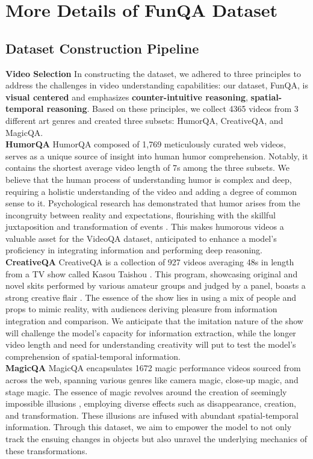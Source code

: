 \section{More Details of FunQA Dataset} \label{appendix_a: FunQA more details}
\subsection{Dataset Construction Pipeline} \label{appendix_a:dataset con}
\noindent\textbf{Video Selection}\quad
In constructing the dataset, we adhered to three principles to address the challenges in video understanding capabilities: our dataset, FunQA, is \textbf{visual centered} and emphasizes \textbf{counter-intuitive reasoning}, \textbf{spatial-temporal reasoning}. Based on these principles, we collect 4365 videos from 3 different art genres and created three subsets: HumorQA, CreativeQA, and MagicQA.\\
\noindent\textbf{HumorQA}\quad
HumorQA composed of 1,769 meticulously curated web videos, serves as a unique source of insight into human humor comprehension. Notably, it contains the shortest average video length of 7s among the three subsets. We believe that the human process of understanding humor is complex and deep, requiring a holistic understanding of the video and adding a degree of common sense to it. Psychological research has demonstrated that humor arises from the incongruity \cite{kant1987critique,sep-humor} between reality and expectations, flourishing with the skillful juxtaposition and transformation of events \cite{latta1999basic,boyd2004laughter,koestler2020act}. This makes humorous videos a valuable asset for the VideoQA dataset, anticipated to enhance a model's proficiency in integrating information and performing deep reasoning.\\
\noindent\textbf{CreativeQA}\quad 
CreativeQA is a collection of 927 videos averaging 48s in length from a TV show called Kasou Taishou \cite{ntv}. This program, showcasing original and novel skits performed by various amateur groups and judged by a panel, boasts a strong creative flair 
 \cite{runco2012standard}. The essence of the show lies in using a mix of people and props to mimic reality, with audiences deriving pleasure from information integration and comparison. We anticipate that the imitation nature of the show will challenge the model's capacity for information extraction, while the longer video length and need for understanding creativity will put to test the model's comprehension of spatial-temporal information.\\
\noindent\textbf{MagicQA}\quad
MagicQA encapsulates 1672 magic performance videos sourced from across the web, spanning various genres like camera magic, close-up magic, and stage magic. The essence of magic revolves around the creation of seemingly impossible illusions \cite{nelms2012magic}, employing diverse effects such as disappearance, creation, and transformation. These illusions are infused with abundant spatial-temporal information. Through this dataset, we aim to empower the model to not only track the ensuing changes in objects but also unravel the underlying mechanics \cite{lamont2005magic} of these transformations.

